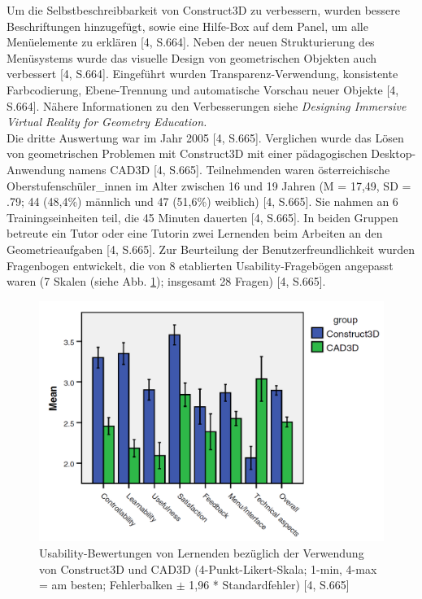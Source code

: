 \documentclass[deutsch]{llncs}
\begin{document}
Um die Selbstbeschreibbarkeit von Construct3D zu verbessern, wurden bessere Beschriftungen hinzugefügt, sowie eine Hilfe-Box auf dem Panel, um alle Menüelemente zu erklären [4, S.664]. Neben der neuen Strukturierung des Menüsystems wurde das visuelle Design von geometrischen Objekten auch verbessert [4, S.664]. Eingeführt wurden Transparenz-Verwendung, konsistente Farbcodierung, Ebene-Trennung und automatische Vorschau neuer Objekte [4, S.664]. Nähere Informationen zu den Verbesserungen siehe \textit{Designing Immersive Virtual Reality for Geometry Education.}\\
Die dritte Auswertung war im Jahr 2005 [4, S.665]. Verglichen wurde das Lösen von geometrischen Problemen mit Construct3D mit einer pädagogischen Desktop-Anwendung namens CAD3D [4, S.665]. Teilnehmenden waren österreichische Oberstufenschüler\_innen im Alter zwischen 16 und 19 Jahren (M = 17,49, SD = .79; 44 (48,4\%) männlich und 47 (51,6\%) weiblich) [4, S.665]. Sie nahmen an 6 Trainingseinheiten teil, die 45 Minuten dauerten [4, S.665]. In beiden Gruppen betreute ein Tutor oder eine Tutorin zwei Lernenden beim Arbeiten an den Geometrieaufgaben [4, S.665]. Zur Beurteilung der Benutzerfreundlichkeit wurden Fragenbogen entwickelt, die von 8 etablierten Usability-Fragebögen angepasst waren (7 Skalen (siehe Abb. \ref{Bewertung}); insgesamt 28 Fragen) [4, S.665].\\
\begin{figure}
\begin{center}
\includegraphics[scale=0.4]{Bilder/Bewertung.PNG}
\caption{Usability-Bewertungen von Lernenden bezüglich der Verwendung von Construct3D und CAD3D (4-Punkt-Likert-Skala; 1-min, 4-max = am besten; Fehlerbalken $\pm$ 1,96 * Standardfehler) [4, S.665]}
\label{Bewertung}
\end{center}
\end{figure}
\end{document}
